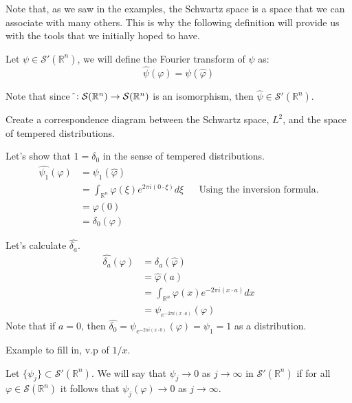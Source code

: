 Note that, as we saw in the examples, the Schwartz space is a space that we can associate with many others. This is why the following definition will provide us with the tools that we initially hoped to have.
\begin{definition}{}
  Let $\psi\in\mathcal{S}'(\mathbb{R}^n)$, we will define the Fourier transform of $\psi$ as:
  $$\hat{\psi}(\varphi)=\psi(\hat{\varphi})$$
\end{definition}
\begin{note}{}
  Note that since $\hat{\empty}:\mathcal{S}(\mathbb{R}^n)\rightarrow \mathcal{S}(\mathbb{R}^n)$ is an isomorphism, then $\hat{\psi}\in\mathcal{S}'(\mathbb{R}^n)$.
\end{note}
\begin{note}{}
  Create a correspondence diagram between the Schwartz space, $L^2$, and the space of tempered distributions.
\end{note}
\begin{example}{}
  Let’s show that $\hat{1}=\delta_{0}$ in the sense of tempered distributions.
  \begin{align*}
    \hat{\psi_{1}}(\varphi)&=\psi_{1}(\hat{\varphi})\\
    &=\int_{\mathbb{R}^n}\hat{\varphi}(\xi)e^{2\pi i(0\cdot \xi)}d\xi &&\text{Using the inversion formula.}\\
    &=\varphi(0)\\
    &=\delta_{0}(\varphi)
  \end{align*}
\end{example}
\begin{example}{}
  Let’s calculate $\hat{\delta_a}$.
  \begin{align*}
    \hat{\delta_{a}}(\varphi)&=\delta_{a}(\hat{\varphi})\\
    &=\hat{\varphi}(a)\\
    &=\int_{\mathbb{R}^n}\varphi(x)e^{-2\pi i (x\cdot a)}dx\\
    &=\psi_{e^{-2\pi i (x\cdot a)}}(\varphi)
  \end{align*}
  Note that if $a=0$, then $\hat{\delta_0}=\psi_{e^{-2\pi i (x\cdot 0)}}(\varphi)=\psi_{1}=1$ as a distribution. 
\end{example}
\begin{example}{}
  Example to fill in, v.p of $1/x$.
\end{example}
\begin{definition}{}
  Let $\{\psi_j\}\subset \mathcal{S}'(\mathbb{R}^n)$. We will say that $\psi_j\rightarrow 0$ as $j \rightarrow \infty$ in $\mathcal{S}'(\mathbb{R}^n)$ if for all $\varphi\in\mathcal{S}(\mathbb{R}^n)$ it follows that $\psi_j(\varphi)\rightarrow 0$ as $j \rightarrow \infty$.
\end{definition}
